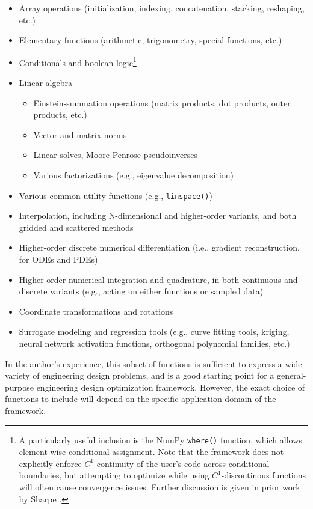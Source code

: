 \begin{itemize}[noitemsep]
    \item Array operations (initialization, indexing, concatenation, stacking, reshaping, etc.)
    \item Elementary functions (arithmetic, trigonometry, special functions, etc.)
    \item Conditionals and boolean logic\footnote{A particularly useful inclusion is the NumPy \texttt{where()} function, which allows element-wise conditional assignment. Note that the framework does not explicitly enforce $C^1$-continuity of the user's code across conditional boundaries, but attempting to optimize while using $C^1$-discontinous functions will often cause convergence issues. Further discussion is given in prior work by Sharpe \cite{sharpe_aerosandbox_2021}.}
    \item Linear algebra
    \begin{itemize}[noitemsep]
        \item Einstein-summation operations (matrix products, dot products, outer products, etc.)
        \item Vector and matrix norms
        \item Linear solves, Moore-Penrose pseudoinverses
        \item Various factorizations (e.g., eigenvalue decomposition)
    \end{itemize}
    \item Various common utility functions (e.g., \texttt{linspace()})
    \item Interpolation, including N-dimensional and higher-order variants, and both gridded and scattered methods
    \item Higher-order discrete numerical differentiation (i.e., gradient reconstruction, for ODEs and PDEs)
    \item Higher-order numerical integration and quadrature, in both continuous and discrete variants (e.g., acting on either functions or sampled data)
    \item Coordinate transformations and rotations
    \item Surrogate modeling and regression tools (e.g., curve fitting tools, kriging, neural network activation functions, orthogonal polynomial families, etc.)
\end{itemize}

In the author's experience, this subset of functions is sufficient to express a wide variety of engineering design problems, and is a good starting point for a general-purpose engineering design optimization framework. However, the exact choice of functions to include will depend on the specific application domain of the framework.

